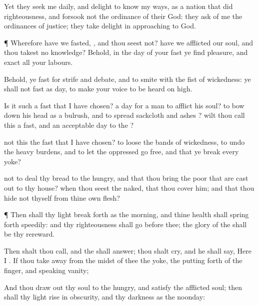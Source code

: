{Yet they
seek me
daily, and
delight to
know my
ways, as a
nation that
did
righteousness, and
forsook not the
ordinance of their
God: they
ask of me the
ordinances of
justice; they take
delight in
approaching to
God.


\par }{\PP {}¶ Wherefore have we
fasted,
{}, and thou
seest not?
{} have we
afflicted our
soul, and thou takest no
knowledge? Behold, in the
day of your
fast ye
find
pleasure, and
exact all your
labours.

Behold, ye
fast for
strife and
debate, and to
smite with the
fist of
wickedness: ye shall not
fast as
{}
day, to make your
voice to be
heard on
high.

Is it such a
fast that I have
chosen? a
day for a
man to
afflict his
soul?
{} to bow
down his
head as a
bulrush, and to
spread
sackcloth and
ashes
{}? wilt thou
call
this a
fast, and an
acceptable
day to the
{}?

 not this the
fast that I have
chosen? to
loose the
bands of
wickedness, to
undo the
heavy
burdens, and to let the
oppressed
go
free, and that ye
break every
yoke?

 not to
deal thy
bread to the
hungry, and that thou
bring the
poor that are cast
out to thy
house? when thou
seest the
naked, that thou
cover him; and that thou
hide not thyself from thine own
flesh?


\par }{\PP {}¶ Then shall thy
light break
forth as the
morning, and thine
health shall spring
forth
speedily: and thy
righteousness shall
go
before thee; the
glory of the
{} shall be thy
rereward.

Then shalt thou
call, and the
{} shall
answer; thou shalt
cry, and he shall
say, Here I
{}. If thou take
away from the
midst of thee the
yoke, the putting
forth of the
finger, and
speaking
vanity;

And
{} thou draw
out thy
soul to the
hungry, and
satisfy the
afflicted
soul; then shall thy
light
rise in
obscurity, and thy
darkness
{} as the
noonday:

}
